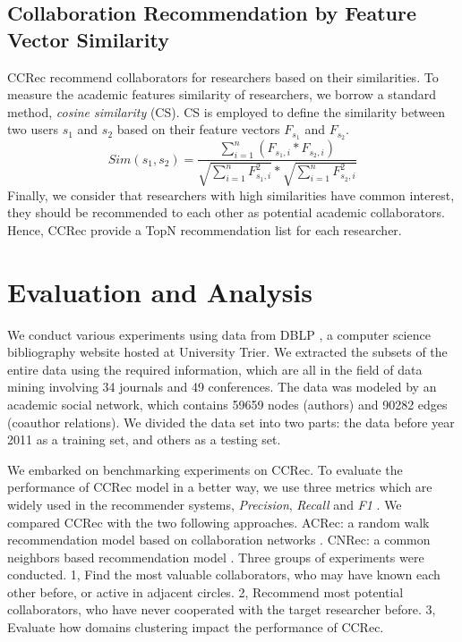 \documentclass{acm_proc_article-sp}
\begin{document}
\subsection{Collaboration Recommendation by Feature Vector Similarity}
CCRec recommend collaborators for researchers based on their similarities. To measure the academic features similarity of researchers, we borrow a standard method, \emph{cosine similarity} (CS). CS is employed to define the similarity between two users $s_{1}$ and $s_{2}$ based on their feature vectors $F_{s_{1}}$ and $F_{s_{2}}$.
\begin{equation}
Sim(s_{1},s_{2})=\frac{\sum_{i=1}^{n}(F_{s_{1},i}*F_{s_{2},i})}{\sqrt{\sum_{i=1}^{n}F_{s_{1},i}^2}*\sqrt{\sum_{i=1}^{n}F_{s_{2},i}^2}}
\end{equation}
Finally, we consider that researchers with high similarities have common interest, they should be recommended to each other as potential academic collaborators. Hence, CCRec provide a TopN recommendation list for each researcher.

\section{Evaluation and Analysis}
We conduct various experiments using data from DBLP \cite{Ley:DBLP}, a computer science bibliography website hosted at University Trier. We extracted the subsets of the entire data using the required information, which are all in the field of data mining involving 34 journals and 49 conferences. The data was modeled by an academic social network, which contains 59659 nodes (authors) and 90282 edges (coauthor relations). We divided the data set into two parts: the data before year 2011 as a training set, and others as a testing set.

We embarked on benchmarking experiments on CCRec. To evaluate the performance of CCRec model in a better way, we use three metrics which are widely used in the recommender systems, \emph{Precision}, \emph{Recall} and \emph{F1} \cite{shani2011evaluating}. We compared CCRec with the two following approaches. ACRec: a random walk recommendation model based on collaboration networks \cite{li2014acrec}. CNRec: a common neighbors based recommendation model \cite{lopes2010collaboration}. Three groups of experiments were conducted. 1, Find the most valuable collaborators, who may have known each other before, or active in adjacent circles. 2, Recommend most potential collaborators, who have never cooperated with the target researcher before. 3, Evaluate how domains clustering impact the performance of CCRec.
\end{document}
